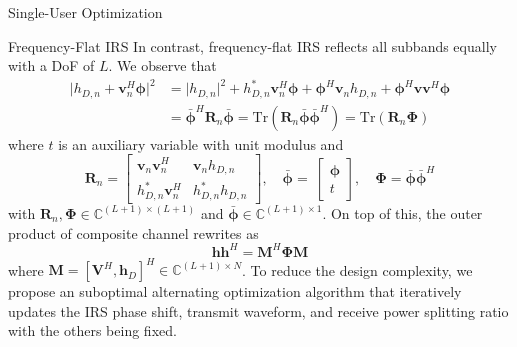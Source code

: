 \documentclass{IEEEtran}
\begin{document}
\begin{section}{Single-User Optimization}
	\begin{subsection}{Frequency-Flat IRS}
		In contrast, frequency-flat IRS reflects all subbands equally with a DoF of $L$. We observe that
		\begin{equation}
			\begin{split}
				\lvert{h_{D,n}+\boldsymbol{v}_n^H\boldsymbol{\phi}}\rvert^2
				&=\lvert{h_{D,n}}\rvert^2+h_{D,n}^*\boldsymbol{v}_n^H\boldsymbol{\phi}+\boldsymbol{\phi}^H\boldsymbol{v}_n{h_{D,n}}+\boldsymbol{\phi}^H\boldsymbol{v}\boldsymbol{v}^H\boldsymbol{\phi}\\
				&=\bar{\boldsymbol{\phi}}^H\boldsymbol{R}_n\bar{\boldsymbol{\phi}}=\mathrm{Tr}(\boldsymbol{R}_n\bar{\boldsymbol{\phi}}\bar{\boldsymbol{\phi}}^H)=\mathrm{Tr}(\boldsymbol{R}_n\boldsymbol{\Phi})
			\end{split}
		\end{equation}
		where $t$ is an auxiliary variable with unit modulus and
		\begin{equation}\label{eq:R_n,phi}
			\boldsymbol{R}_n=
			\begin{bmatrix}
				\boldsymbol{v}_n\boldsymbol{v}_n^H & \boldsymbol{v}_n{h_{D,n}} \\
				h_{D,n}^*{\boldsymbol{v}_n^H}      & h_{D,n}^*{h_{D,n}}
			\end{bmatrix},
			\quad \bar{\boldsymbol{\phi}}=\
			\begin{bmatrix}
				\boldsymbol{\phi} \\
				t
			\end{bmatrix},
			\quad \boldsymbol{\Phi}=\bar{\boldsymbol{\phi}}\bar{\boldsymbol{\phi}}^H
		\end{equation}
		with $\boldsymbol{R}_n,\boldsymbol{\Phi} \in \mathbb{C}^{(L+1) \times (L+1)}$ and $\bar{\boldsymbol{\phi}} \in \mathbb{C}^{(L+1) \times 1}$. On top of this, the outer product of composite channel rewrites as
		\begin{equation}
			\boldsymbol{h}\boldsymbol{h}^H=\boldsymbol{M}^H\boldsymbol{\Phi}\boldsymbol{M}
		\end{equation}
		where $\boldsymbol{M}=[\boldsymbol{V}^H,\boldsymbol{h}_D]^H \in \mathbb{C}^{(L+1) \times N}$. To reduce the design complexity, we propose an suboptimal alternating optimization algorithm that iteratively updates the IRS phase shift, transmit waveform, and receive power splitting ratio with the others being fixed.


\end{subsection}
\end{section}
\end{document}
